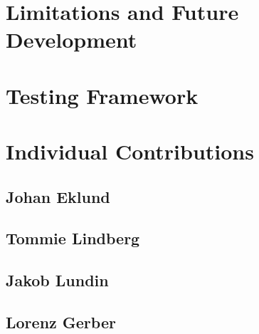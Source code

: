 \documentclass[a4paper,11pt,twoside]{article}
\begin{document}
\section{Limitations and Future Development}

\section{Testing Framework}


\section{Individual Contributions}
\subsection{Johan Eklund}
\subsection{Tommie Lindberg}
\subsection{Jakob Lundin}
\subsection{Lorenz Gerber}


\end{document}
